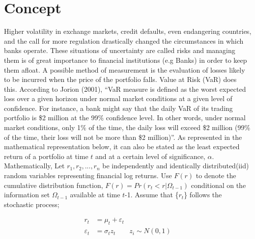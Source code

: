 \documentclass[a4paper,11pt,oneside]{book}
\begin{document}

\section{Concept}
Higher volatility in exchange markets, credit defaults, even endangering countries, and the call for more regulation drastically changed the circumstances in which banks operate. These situations of uncertainty are called risks and managing them is of great importance to financial institutions (e.g Banks) in order to keep them afloat. A possible method of measurement is the evaluation of losses likely to be incurred when the price of the portfolio falls. Value at Risk (VaR) does this.
\newline\newline
According to Jorion (2001), “VaR measure is defined as the worst
expected loss over a given horizon under normal market conditions
at a given level of confidence. For instance, a bank might say that
the daily VaR of its trading portfolio is \$2 million at the 99\%
confidence level. In other words, under normal market conditions,
only 1\% of the time, the daily loss will exceed \$2 million (99\% of the time, their loss will not be more than \$2 million)”. As represented in the mathematical representation below, it can also be stated as the least expected return of a portfolio at time $t$ and at a certain level of significance, $\alpha$.
\newline\newline
Mathematically,\newline\newline
Let $r_1, r_2, ..., r_n$ be independently and identically distributed(iid) random variables representing financial log returns. Use $F(r)$ to denote the cumulative distribution function,
$F(r) = Pr(r_{t} < r|\Omega_{t-1})$ conditional on the information set $\Omega_{t-1}$ available at time $t$-1. Assume that \{$r_t$\} follows the stochastic process; \newline

\begin{equation}
\begin{aligned}
r_t &= \mu_t + \varepsilon_t
\\
\varepsilon_t &= \sigma_t  z_t \qquad   z_i \sim N(0,1)
\label{1}
\end{aligned}
\end{equation}
\end{document}
